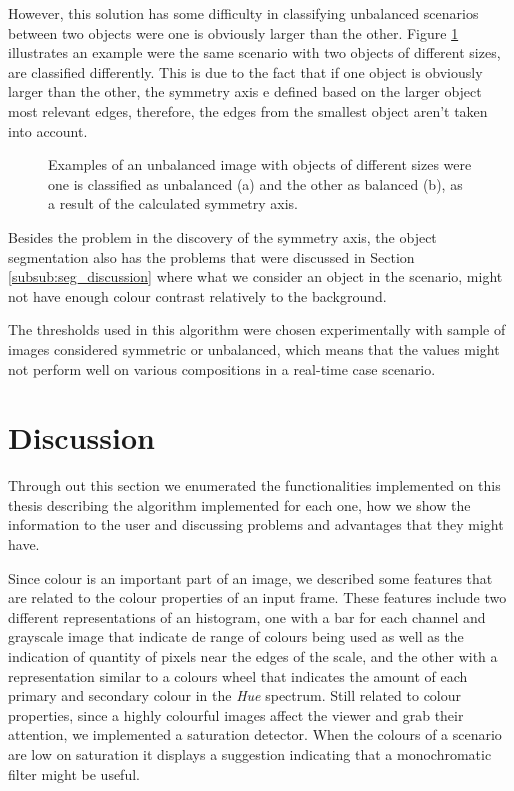 However, this solution has some difficulty in classifying unbalanced scenarios between two objects were one is obviously larger than the other. Figure \ref{fig:unbalance_test} illustrates an example were the same scenario with two objects of different sizes, are classified differently. This is due to the fact that if one object is obviously larger than the other, the symmetry axis e defined based on the larger object most relevant edges, therefore, the edges from the smallest object aren't taken into account.

\begin{figure}[htbp]
	\centering
    \caption{Examples of an unbalanced image with objects of different sizes were one is classified as unbalanced (a) and the other as balanced (b), as a result of the calculated symmetry axis.}
    \label{fig:unbalance_test}
\end{figure}


Besides the problem in the discovery of the symmetry axis, the object segmentation also has the problems that were discussed in Section \ref{subsub:seg_discussion} where what we consider an object in the scenario, might not have enough colour contrast relatively to the background.

The thresholds used in this algorithm were chosen experimentally with sample of images considered symmetric or unbalanced, which means that the values might not perform well on various compositions in a real-time case scenario.

\section{Discussion}
\label{sec:system_discussion}

Through out this section we enumerated the functionalities implemented on this thesis describing the algorithm implemented for each one, how we show the information to the user and discussing problems and advantages that they might have.

Since colour is an important part of an image, we described some features that are related to the colour properties of an input frame. These features include two different representations of an histogram, one with a bar for each channel and grayscale image that indicate de range of colours being used as well as the indication of quantity of pixels near the edges of the scale, and the other with a representation similar to a colours wheel that indicates the amount of each primary and secondary colour in the \emph{Hue} spectrum. Still related to colour properties, since a highly colourful images affect the viewer and grab their attention, we implemented a saturation detector. When the colours of a scenario are low on saturation it displays a suggestion indicating that a monochromatic filter might be useful.

